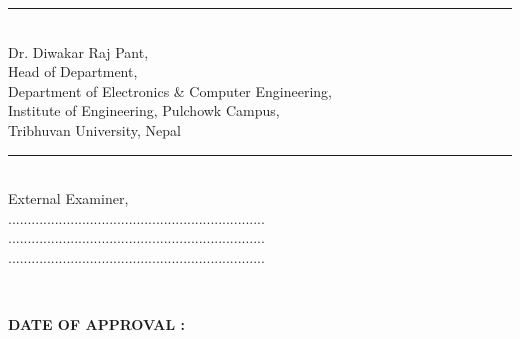 \begin{minipage}[t]{0.55\textwidth}
  \rule{2in}{1pt}\\
  Dr. Diwakar Raj Pant,\\
  Head of Department,\\
  \small
  Department of Electronics \& Computer Engineering,\\
  Institute of Engineering, Pulchowk Campus,\\
  Tribhuvan University, Nepal
\end{minipage}
\hspace{0.5cm}
\begin{minipage}[t]{0.40\textwidth}
  \rule{2in}{1pt}\\
  External Examiner,\\
  ..................................................................\\
  ..................................................................\\
  ..................................................................\\
\end{minipage}

~

\textbf{DATE OF APPROVAL :}